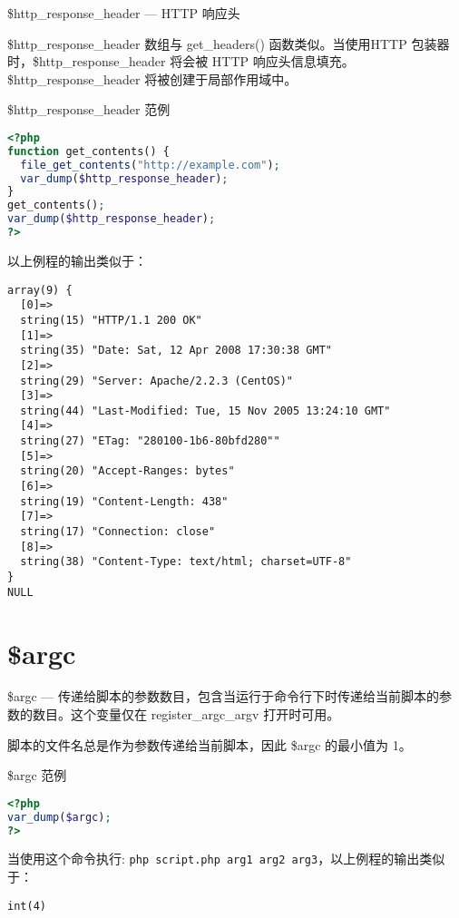 \$http\_response\_header — HTTP 响应头

\$http\_response\_header 数组与 get\_headers() 函数类似。当使用HTTP 包装器时，\$http\_response\_header 将会被 HTTP 响应头信息填充。\$http\_response\_header 将被创建于局部作用域中。



\begin{example}
\$http\_response\_header 范例
\begin{lstlisting}[language=PHP]
<?php
function get_contents() {
  file_get_contents("http://example.com");
  var_dump($http_response_header);
}
get_contents();
var_dump($http_response_header);
?>
\end{lstlisting}
\end{example}

以上例程的输出类似于：

\begin{verbatim}
array(9) {
  [0]=>
  string(15) "HTTP/1.1 200 OK"
  [1]=>
  string(35) "Date: Sat, 12 Apr 2008 17:30:38 GMT"
  [2]=>
  string(29) "Server: Apache/2.2.3 (CentOS)"
  [3]=>
  string(44) "Last-Modified: Tue, 15 Nov 2005 13:24:10 GMT"
  [4]=>
  string(27) "ETag: "280100-1b6-80bfd280""
  [5]=>
  string(20) "Accept-Ranges: bytes"
  [6]=>
  string(19) "Content-Length: 438"
  [7]=>
  string(17) "Connection: close"
  [8]=>
  string(38) "Content-Type: text/html; charset=UTF-8"
}
NULL
\end{verbatim}






\section{\$argc}


\$argc — 传递给脚本的参数数目，包含当运行于命令行下时传递给当前脚本的参数的数目。这个变量仅在 register\_argc\_argv 打开时可用。

脚本的文件名总是作为参数传递给当前脚本，因此 \$argc 的最小值为 1。



\begin{example}
\$argc 范例
\begin{lstlisting}[language=PHP]
<?php
var_dump($argc);
?>
\end{lstlisting}
\end{example}

当使用这个命令执行: \verb|php script.php arg1 arg2 arg3|，以上例程的输出类似于：

\begin{verbatim}
int(4)
\end{verbatim}



